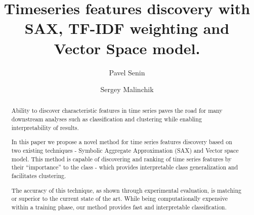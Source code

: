 \documentclass{llncs}
\begin{document}
%
\mainmatter              %
%
\title{Timeseries features discovery with SAX, TF-IDF weighting and Vector Space model.}
%
%
\author{Pavel Senin
\and Sergey Malinchik
}
%
%
%


\maketitle              %

\begin{abstract}
Ability to discover characteristic features in time series paves the road 
for many downstream analyses such as classification and clustering while 
enabling interpretability of results.

In this paper we propose a novel method for time series features discovery 
based on two existing techniques - Symbolic Aggregate Approximation (SAX) 
and Vector space model. This method is capable of discovering and ranking of 
time series features by their ``importance'' to the class - which provides 
interpretable class generalization and facilitates clustering.

The accuracy of this technique, as shown through experimental evaluation, 
is matching or superior to the current state of the art. While being 
computationally expensive within a training phase, our method provides fast 
and interpretable classification.

\end{abstract}
%
\end{document}
